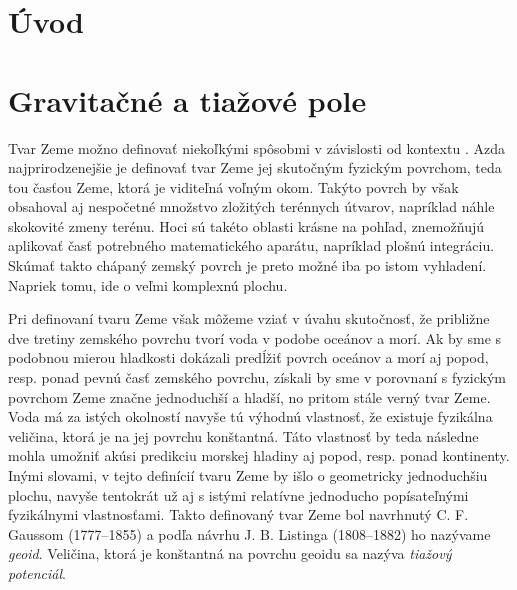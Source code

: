 \documentclass[a4paper, 12pt]{book}
\begin{document}
\tableofcontents
\newpage







\chapter*{Úvod}







\chapter{Gravitačné a tiažové pole}
\label{sec:gravitational_and_gravity_field}

Tvar Zeme možno definovať niekoľkými spôsobmi v závislosti od kontextu 
\citep{MoritzTheFigureOfTheEarth}.  Azda najprirodzenejšie je definovať tvar 
Zeme jej skutočným fyzickým povrchom, teda tou časťou Zeme, ktorá je viditeľná 
voľným okom.  Takýto povrch by však obsahoval aj nespočetné množstvo zložitých 
terénnych útvarov, napríklad náhle skokovité zmeny terénu.  Hoci sú takéto 
oblasti krásne na pohľad, znemožňujú aplikovať časť potrebného matematického 
aparátu, napríklad plošnú integráciu.  Skúmať takto chápaný zemský povrch je 
preto možné iba po istom vyhladení.  Napriek tomu, ide o veľmi komplexnú 
plochu.

Pri definovaní tvaru Zeme však môžeme vziať v úvahu skutočnosť, že približne 
dve tretiny zemského povrchu tvorí voda v podobe oceánov a morí.  Ak by sme 
s podobnou mierou hladkosti dokázali predĺžiť povrch oceánov a morí aj popod, 
resp. ponad pevnú časť zemského povrchu, získali by sme v porovnaní s fyzickým 
povrchom Zeme značne jednoduchší a hladší, no pritom stále verný tvar Zeme.  
Voda má za istých okolností navyše tú výhodnú vlastnosť, že existuje fyzikálna 
veličina, ktorá je na jej povrchu konštantná.  Táto vlastnosť by teda následne 
mohla umožniť akúsi predikciu morskej hladiny aj popod, resp. ponad kontinenty.  
Inými slovami, v tejto definícií tvaru Zeme by išlo o geometricky jednoduchšiu 
plochu, navyše tentokrát už aj s istými relatívne jednoducho popísateľnými 
fyzikálnymi vlastnosťami.  Takto definovaný tvar Zeme bol navrhnutý 
C. F. Gaussom (1777--1855) a podľa návrhu J. B. Listinga (1808--1882) ho 
nazývame \emph{geoid}.  Veličina, ktorá je konštantná na povrchu geoidu sa 
nazýva \emph{tiažový potenciál}.
\end{document}
